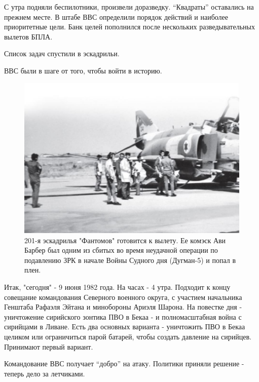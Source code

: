 С утра подняли беспилотники, произвели доразведку. “Квадраты” оставались на прежнем месте. В штабе ВВС определили порядок действий и наиболее приоритетные цели. Банк целей пополнился после нескольких разведывательных вылетов БПЛА.

Список задач спустили в эскадрильи.

ВВС были в шаге от того, чтобы войти в историю.

\begin{figure}[h!tb] 
	\centering\includegraphics[scale=0.3]{Bekaa_2/58VsCDFGsQY.jpg}
	\caption{201-я эскадрилья "Фантомов" готовится к вылету. Ее комэск Ави Барбер был одним из сбитых во время неудачной операции по подавлению ЗРК в начале Войны Судного дня (Дугман-5) и попал в плен.}
\end{figure}	
	
Итак, "сегодня" - 9 июня 1982 года. На часах - 4 утра. Подходит к концу совещание командования Северного военного округа, с участием начальника Генштаба Рафаэля Эйтана и минобороны Ариэля Шарона. На повестке дня - уничтожение сирийского зонтика ПВО в Бекаа - и полномасштабная война с сирийцами в Ливане. Есть два основных варианта - уничтожить ПВО в Бекаа целиком или ограничиться парой батарей, чтобы создать давление на сирийцев. Принимают первый вариант.

Командование ВВС получает “добро” на атаку. Политики приняли решение - теперь дело за летчиками.

